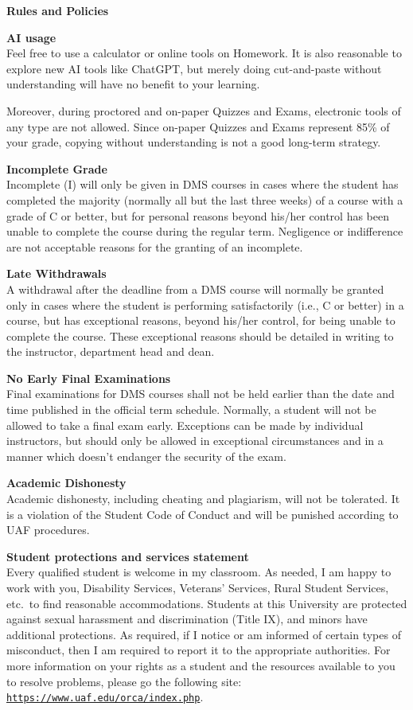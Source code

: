 \documentclass[12pt]{article}
\renewcommand{\emph}[1]{\textsf{\textbf{#1}}}
\newcommand{\localhead}[1]{\par\smallskip\textbf{#1} \smallskip\nobreak\\}%
\def\heading#1{\localhead{\large\emph{#1}}}
\def\subheading#1{\localhead{\emph{#1}}}
\begin{document}
\heading{Rules and Policies}
\vskip -20pt

\subheading{AI usage}
Feel free to use a calculator or online tools on Homework.  It is also reasonable to explore new AI tools like ChatGPT, but merely doing cut-and-paste without understanding will have no benefit to your learning. 

Moreover, during proctored and on-paper Quizzes and Exams, electronic tools of any type are not allowed.  Since on-paper Quizzes and Exams represent 85\% of your grade, copying without understanding is not a good long-term strategy.

\subheading{Incomplete Grade} 
Incomplete (I) will only be given in
  DMS courses in cases where
  the student has completed the majority (normally all but the last
  three weeks) of a course with a grade of C or better, but for
  personal reasons beyond his/her control has been unable to complete
  the course during the regular term. Negligence or indifference are
  not acceptable reasons for the granting of an incomplete. 

\subheading{Late Withdrawals} 
A withdrawal after the deadline from a DMS course will
  normally be granted only in cases where the student is performing
  satisfactorily (i.e., C or better) in a course, but has exceptional
  reasons, beyond his/her control, for being unable to complete the
  course. These exceptional reasons should be detailed in writing to
  the instructor, department head and dean.

\subheading{No Early Final Examinations}
Final examinations for DMS
  courses shall not be held earlier than the date and time published
  in the official term schedule. Normally, a student will not be
  allowed to take a final exam early. Exceptions can be made by
  individual instructors, but should only be allowed in exceptional
  circumstances and in a manner which doesn't endanger the security of
  the exam.

\subheading{Academic Dishonesty}
Academic dishonesty, including cheating and plagiarism, will not
be tolerated.  It is a violation of the Student Code of Conduct
and will be punished according to UAF procedures.


\subheading{Student protections and services statement}
Every qualified student is welcome in my classroom.  As needed, I am happy to work with you, Disability Services, Veterans' Services, Rural Student Services, etc.~to find reasonable accommodations.  Students at this University are protected against sexual harassment and discrimination (Title IX), and minors have additional protections.  As required, if I notice or am informed of certain types of misconduct, then I am required to report it to the appropriate authorities.  For more information on your rights as a student and the resources available to you to resolve problems, please go the following site: \href{https://www.uaf.edu/orca/index.php}{\texttt{https://www.uaf.edu/orca/index.php}}.
\end{document}
